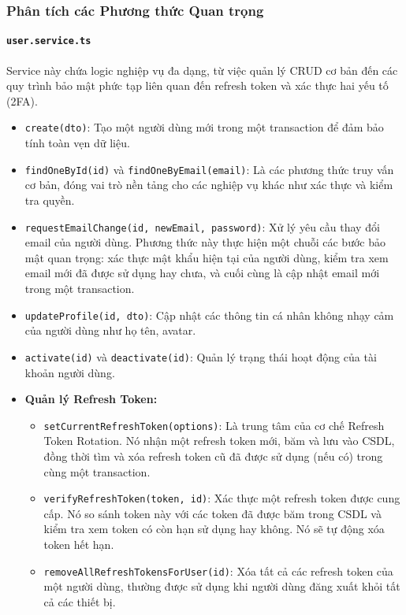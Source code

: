 \subsubsection{Phân tích các Phương thức Quan trọng}

\paragraph{\texttt{user.service.ts}}
Service này chứa logic nghiệp vụ đa dạng, từ việc quản lý CRUD cơ bản đến các quy trình bảo mật phức tạp liên quan đến refresh token và xác thực hai yếu tố (2FA).

\begin{itemize}
    \item \texttt{create(dto)}: Tạo một người dùng mới trong một transaction để đảm bảo tính toàn vẹn dữ liệu.
    
    \item \texttt{findOneById(id)} và \texttt{findOneByEmail(email)}: Là các phương thức truy vấn cơ bản, đóng vai trò nền tảng cho các nghiệp vụ khác như xác thực và kiểm tra quyền.
    
    \item \texttt{requestEmailChange(id, newEmail, password)}: Xử lý yêu cầu thay đổi email của người dùng. Phương thức này thực hiện một chuỗi các bước bảo mật quan trọng: xác thực mật khẩu hiện tại của người dùng, kiểm tra xem email mới đã được sử dụng hay chưa, và cuối cùng là cập nhật email mới trong một transaction.
    
    \item \texttt{updateProfile(id, dto)}: Cập nhật các thông tin cá nhân không nhạy cảm của người dùng như họ tên, avatar.
    
    \item \texttt{activate(id)} và \texttt{deactivate(id)}: Quản lý trạng thái hoạt động của tài khoản người dùng.
    
    \item \textbf{Quản lý Refresh Token:}
    \begin{itemize}
        \item \texttt{setCurrentRefreshToken(options)}: Là trung tâm của cơ chế Refresh Token Rotation. Nó nhận một refresh token mới, băm và lưu vào CSDL, đồng thời tìm và xóa refresh token cũ đã được sử dụng (nếu có) trong cùng một transaction.
        \item \texttt{verifyRefreshToken(token, id)}: Xác thực một refresh token được cung cấp. Nó so sánh token này với các token đã được băm trong CSDL và kiểm tra xem token có còn hạn sử dụng hay không. Nó sẽ tự động xóa token hết hạn.
        \item \texttt{removeAllRefreshTokensForUser(id)}: Xóa tất cả các refresh token của một người dùng, thường được sử dụng khi người dùng đăng xuất khỏi tất cả các thiết bị.
    \end{itemize}
    

\end{itemize}
